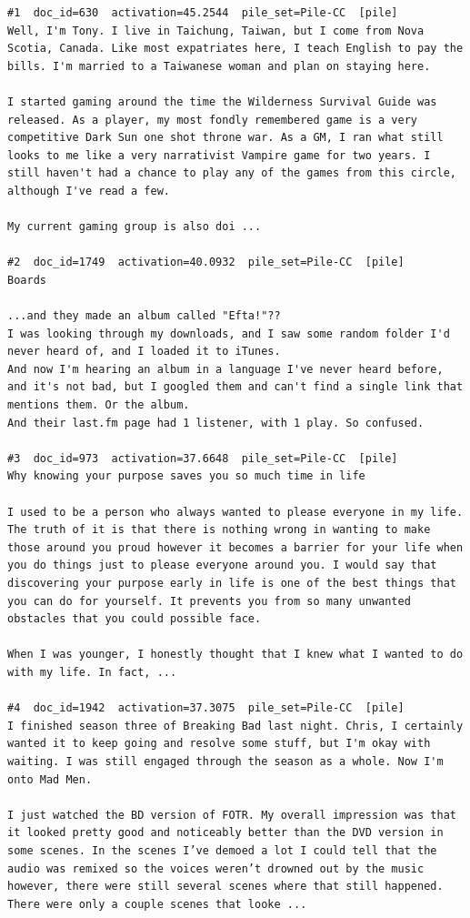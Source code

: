 \begin{verbatim}
#1  doc_id=630  activation=45.2544  pile_set=Pile-CC  [pile]
Well, I'm Tony. I live in Taichung, Taiwan, but I come from Nova Scotia, Canada. Like most expatriates here, I teach English to pay the bills. I'm married to a Taiwanese woman and plan on staying here.

I started gaming around the time the Wilderness Survival Guide was released. As a player, my most fondly remembered game is a very competitive Dark Sun one shot throne war. As a GM, I ran what still looks to me like a very narrativist Vampire game for two years. I still haven't had a chance to play any of the games from this circle, although I've read a few.

My current gaming group is also doi ...

#2  doc_id=1749  activation=40.0932  pile_set=Pile-CC  [pile]
Boards

...and they made an album called "Efta!"??
I was looking through my downloads, and I saw some random folder I'd never heard of, and I loaded it to iTunes.
And now I'm hearing an album in a language I've never heard before, and it's not bad, but I googled them and can't find a single link that mentions them. Or the album.
And their last.fm page had 1 listener, with 1 play. So confused.

#3  doc_id=973  activation=37.6648  pile_set=Pile-CC  [pile]
Why knowing your purpose saves you so much time in life

I used to be a person who always wanted to please everyone in my life. The truth of it is that there is nothing wrong in wanting to make those around you proud however it becomes a barrier for your life when you do things just to please everyone around you. I would say that discovering your purpose early in life is one of the best things that you can do for yourself. It prevents you from so many unwanted obstacles that you could possible face.

When I was younger, I honestly thought that I knew what I wanted to do with my life. In fact, ...

#4  doc_id=1942  activation=37.3075  pile_set=Pile-CC  [pile]
I finished season three of Breaking Bad last night. Chris, I certainly wanted it to keep going and resolve some stuff, but I'm okay with waiting. I was still engaged through the season as a whole. Now I'm onto Mad Men.

I just watched the BD version of FOTR. My overall impression was that it looked pretty good and noticeably better than the DVD version in some scenes. In the scenes I’ve demoed a lot I could tell that the audio was remixed so the voices weren’t drowned out by the music however, there were still several scenes where that still happened. There were only a couple scenes that looke ...


\end{verbatim}
